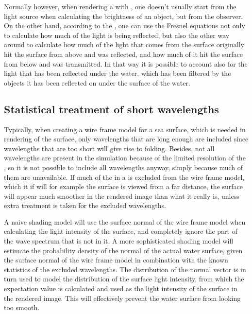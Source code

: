 Normally however, when rendering a \scene with , one doesn't usually start from the light source when calculating the brightness of an object, but from the observer. On the other hand, according to the , one can use the Fresnel equations not only to calculate how much of the light is being reflected, but also the other way around to calculate how much of the light that comes from the surface originally hit the surface from above and was reflected, and how much of it hit the surface from below and was transmitted. In that way it is possible to account also for the light that has been reflected under the water, which has been filtered by the objects it has been reflected on under the surface of the water.

\subsection{Statistical treatment of short wavelengths}

Typically, when creating a wire frame model for a sea surface, which is needed in rendering of the surface, only wavelengths that are long enough are included since wavelengths that are too short will give rise to folding. Besides, not all wavelengths are present in the simulation because of the limited resolution of the \grid, so it is not possible to include all wavelengths anyway, simply because much of them are unavailable. If much of the  in a  is excluded from the wire frame model, which it if will for example the surface is viewed from a far distance, the surface will appear much smoother in the rendered image than what it really is, unless extra treatment is taken for the excluded wavelengths.

A naive shading model will use the surface normal of the wire frame model when calculating the light intensity of the surface, and completely ignore the part of the wave spectrum that is not in it. A more sophisticated shading model will estimate the probability density of the normal of the actual water surface, given the surface normal of the wire frame model in combination with the known statistics of the excluded wavelengths. The distribution of the normal vector is in turn used to model the distribution of the surface light intensity, from which the expectation value is calculated and used as the light intensity of the surface in the rendered image. This will effectively prevent the water surface from looking too smooth.

